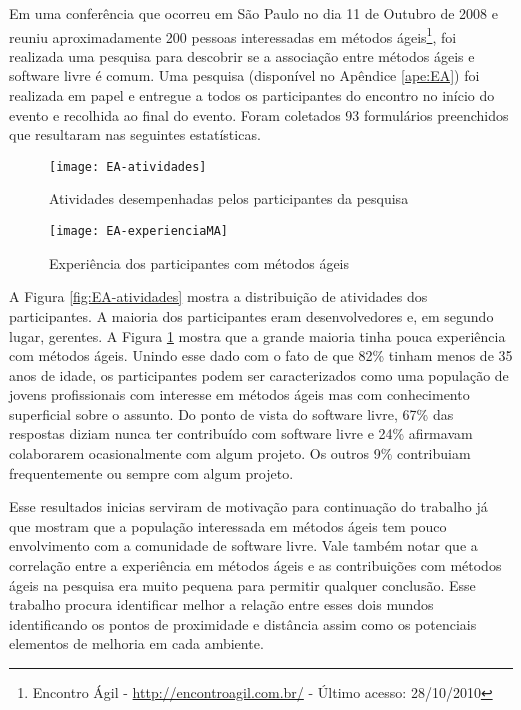 Em uma conferência que ocorreu em São Paulo no dia 11 de Outubro de
2008 e reuniu aproximadamente 200 pessoas interessadas em métodos
ágeis\footnote{Encontro Ágil - \url{http://encontroagil.com.br/} -
  Último acesso: 28/10/2010}, foi realizada uma pesquisa para
descobrir se a associação entre métodos ágeis e software livre é
comum. Uma pesquisa (disponível no Apêndice \ref{ape:EA}) foi
realizada em papel e entregue a todos os participantes do encontro no
início do evento e recolhida ao final do evento. Foram coletados 93
formulários preenchidos que resultaram nas seguintes estatísticas.

\begin{figure}[htb]
  \begin{minipage}[t]{0.5\linewidth}
    \centering
    \texttt{[image: EA-atividades]}
    \caption{Atividades desempenhadas pelos participantes da pesquisa}
    \label{fig:EA-atividades}
  \end{minipage}
  \begin{minipage}[t]{0.5\linewidth}
    \centering
    \texttt{[image: EA-experienciaMA]}
    \caption{Experiência dos participantes com métodos ágeis}
    \label{fig:EA-experienciaMA}
  \end{minipage}
\end{figure}

A Figura \ref{fig:EA-atividades} mostra a distribuição de atividades
dos participantes. A maioria dos participantes eram desenvolvedores e,
em segundo lugar, gerentes. A Figura \ref{fig:EA-experienciaMA} mostra
que a grande maioria tinha pouca experiência com métodos ágeis. Unindo
esse dado com o fato de que 82\% tinham menos de 35 anos de idade, os
participantes podem ser caracterizados como uma população de jovens
profissionais com interesse em métodos ágeis mas com conhecimento
superficial sobre o assunto. Do ponto de vista do software livre, 67\%
das respostas diziam nunca ter contribuído com software livre e 24\%
afirmavam colaborarem ocasionalmente com algum projeto. Os outros 9\%
contribuiam frequentemente ou sempre com algum projeto.

Esse resultados inicias serviram de motivação para continuação do
trabalho já que mostram que a população interessada em métodos ágeis
tem pouco envolvimento com a comunidade de software livre. Vale também
notar que a correlação entre a experiência em métodos ágeis e as
contribuições com métodos ágeis na pesquisa era muito pequena para
permitir qualquer conclusão. Esse trabalho procura
identificar melhor a relação entre esses dois mundos identificando os
pontos de proximidade e distância assim como os potenciais elementos
de melhoria em cada ambiente.

